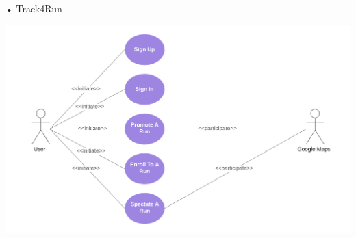 \begin{enumerate}
\begin{minipage}{\textwidth}
\item[•]{\Large Track4Run}
\FloatBarrier
\begin{center}
\includegraphics[scale=0.70]{Images/UseCaseDiagrams/Track4RunCaseDiagram.png}
\end{center}
\FloatBarrier
\end{minipage}
\end{enumerate}

